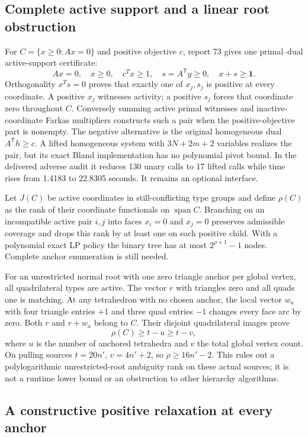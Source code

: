 \subsection{Complete active support and a linear root obstruction}

For $C=\{x\ge0:Ax=0\}$ and positive objective $c$, report 73 gives one
primal--dual active-support certificate:
\[
 Ax=0,\quad x\ge0,\quad c^Tx\ge1,\quad
 s=A^{\mathsf T}y\ge0,\quad x+s\ge\mathbf1.
\]
Orthogonality $x^Ts=0$ proves that exactly one of $x_j,s_j$ is positive
at every coordinate. A positive $x_j$ witnesses activity; a positive $s_j$
forces that coordinate zero throughout $C$. Conversely summing active
primal witnesses and inactive-coordinate Farkas multipliers constructs
such a pair when the positive-objective part is nonempty. The negative
alternative is the original homogeneous dual $A^{\mathsf T}h\ge c$.
A lifted homogeneous system with $3N+2m+2$ variables realizes the pair,
but its exact Bland implementation has no polynomial pivot bound. In the
delivered adverse audit it reduces 130 unary calls to 17 lifted calls while
time rises from 1.4183 to 22.8305 seconds. It remains an optional interface.

Let $J(C)$ be active coordinates in still-conflicting type groups and define
$\rho(C)$ as the rank of their coordinate functionals on $\operatorname{span}C$.
Branching on an incompatible active pair $i,j$ into faces $x_i=0$ and
$x_j=0$ preserves admissible coverage and drops this rank by at least one
on each positive child. With a polynomial exact LP policy the binary tree
has at most $2^{\rho+1}-1$ nodes. Complete anchor enumeration is still needed.

For an unrestricted normal root with one zero triangle anchor per global
vertex, all quadrilateral types are active. The vector $r$ with triangles
zero and all quads one is matching. At any tetrahedron with no chosen anchor,
the local vector $w_a$ with four triangle entries $+1$ and three quad entries
$-1$ changes every face arc by zero. Both $r$ and $r+w_a$ belong to $C$.
Their disjoint quadrilateral images prove
\[
 \rho(C)\ge t-u\ge t-v,
\]
where $u$ is the number of anchored tetrahedra and $v$ the total global
vertex count. On pulling sources $t=20n'$, $v=4n'+2$, so
$\rho\ge16n'-2$. This rules out a polylogarithmic unrestricted-root ambiguity
rank on these actual sources; it is not a runtime lower bound or an
obstruction to other hierarchy algorithms.

\subsection{A constructive positive relaxation at every anchor}


